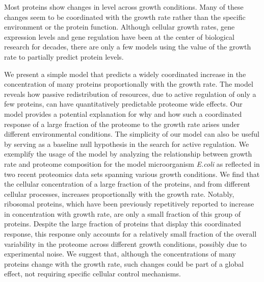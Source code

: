 Most proteins show changes in level across growth conditions.
Many of these changes seem to be coordinated with the growth rate rather than the specific environment or the protein function.
Although cellular growth rates, gene expression levels and gene regulation have been at the center of biological research for decades, there are only a few models using the value of the growth rate to partially predict protein levels.

We present a simple model that predicts a widely coordinated increase in the concentration of many proteins proportionally with the growth rate.
The model reveals how passive redistribution of resources, due to active regulation of only a few proteins, can have quantitatively predictable proteome wide effects.
Our model provides a potential explanation for why and how such a coordinated response of a large fraction of the proteome to the growth rate arises under different environmental conditions.
The simplicity of our model can also be useful by serving as a baseline null hypothesis in the search for active regulation.
We exemplify the usage of the model by analyzing the relationship between growth rate and proteome composition for the model microorganism \emph{E.coli} as reflected in two recent proteomics data sets spanning various growth conditions.
We find that the cellular concentration of a large fraction of the proteins, and from different cellular processes, increases proportionally with the growth rate.
Notably, ribosomal proteins, which have been previously repetitively reported to increase in concentration with growth rate, are only a small fraction of this group of proteins.
Despite the large fraction of proteins that display this coordinated response, this response only accounts for a relatively small fraction of the overall variability in the proteome across different growth conditions, possibly due to experimental noise.
We suggest that, although the concentrations of many proteins change with the growth rate, such changes could be part of a global effect, not requiring specific cellular control mechanisms.